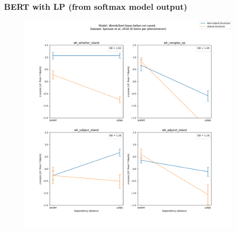 \clearpage
\subsubsection{BERT with LP (from softmax model output)}
\begin{figure}[h]
	\centering
	\includegraphics[width=1\textwidth]{images/AppendixA/Sprouse_wh_dbmdz_bert-base-italian-xxl-cased_LP-zscores-likert-2022-07-11.png} 
\end{figure}

\clearpage
